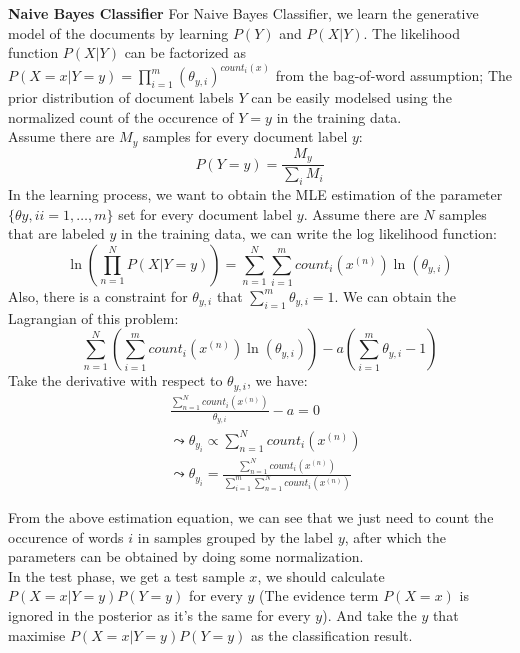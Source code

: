 \documentclass{article}
\theoremstyle{definition}
\theoremstyle{definition}
\theoremstyle{remark}
\begin{document}
\begin{addmargin}[3em]{2em}
  \textbf{Naive Bayes Classifier}
  For Naive Bayes Classifier, we learn the generative model of the documents by learning $P(Y)$ and $P(X|Y)$. The likelihood function $P(X|Y)$ can be factorized as $P(X = x|Y = y) = \prod_{i=1}^m (\theta_{y,i})^{count_i(x)}$ from the bag-of-word assumption; The prior distribution of document labels $Y$ can be easily modelsed using the normalized count of the occurence of $Y=y$ in the training data.\\
  Assume there are $M_y$ samples for every document label $y$:
  \[
  P(Y = y) = \frac{M_y}{\sum_{i} M_i}
  \]
  In the learning process, we want to obtain the MLE estimation of the parameter $\{\theta{y, i} i=1,\dots, m\}$ set for every document label $y$. Assume there are $N$ samples that are labeled $y$ in the training data, we can write the log likelihood function:
  \[
  \ln(\prod_{n=1}^N P(X | Y=y)) = \sum_{n=1}^N \sum_{i=1}^m count_i(x^{(n)}) \ln(\theta_{y,i})
  \]
  Also, there is a constraint for $\theta_{y,i}$ that $\sum_{i=1}^{m} \theta_{y, i} = 1$. We can obtain the Lagrangian of this problem:
  \[
  \sum_{n=1}^N (\sum_{i=1}^m count_i(x^{(n)}) \ln(\theta_{y,i})) - a(\sum_{i=1}^m \theta_{y, i} - 1)
  \]
  Take the derivative with respect to $\theta_{y, i}$, we have:
  \[
  \begin{split}
    & \frac{\sum_{n=1}^N count_i(x^{(n)})}{\theta_{y, i}} - a = 0\\
    & \leadsto \theta_{y_i} \propto \sum_{n=1}^N count_i(x^{(n)})\\
    & \leadsto \theta_{y_i} = \frac{\sum_{n=1}^N count_i(x^{(n)})}{\sum_{i=1}^m \sum_{n=1}^N count_i(x^{(n)})}
  \end{split}
  \]

  From the above estimation equation, we can see that we just need to count the occurence of words $i$ in samples grouped by the label $y$, after which the parameters can be obtained by doing some normalization.\\

  In the test phase, we get a test sample $x$, we should calculate $P(X=x|Y=y)P(Y=y)$ for every $y$ (The evidence term $P(X=x)$ is ignored in the posterior as it's the same for every $y$). And take the $y$ that maximise $P(X=x|Y=y)P(Y=y)$ as the classification result.\\


\end{addmargin}
\end{document}
